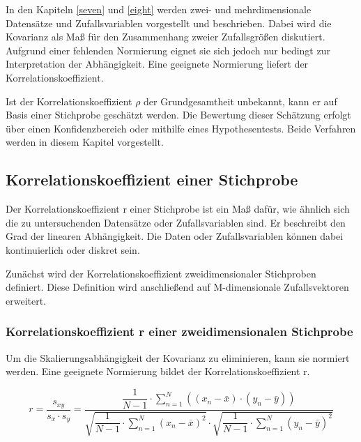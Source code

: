 \noindent In den Kapiteln \ref{seven} und \ref{eight} werden zwei- und mehrdimensionale Datens\"{a}tze und Zufallsvariablen vorgestellt und beschrieben. Dabei wird die Kovarianz als Ma{\ss} f\"{u}r den Zusammenhang zweier Zufallsgr\"{o}{\ss}en diskutiert. Aufgrund einer fehlenden Normierung eignet sie sich jedoch nur bedingt zur Interpretation der Abh\"{a}ngigkeit. Eine geeignete Normierung liefert der Korrelationskoeffizient.\newline

\noindent Ist der Korrelationskoeffizient $\rho$ der Grundgesamtheit unbekannt, kann er auf Basis einer Stichprobe gesch\"{a}tzt werden. Die Bewertung dieser Sch\"{a}tzung erfolgt \"{u}ber einen Konfidenzbereich oder mithilfe eines Hypothesentests. Beide Verfahren werden in diesem Kapitel vorgestellt.

\subsection{Korrelationskoeffizient einer Stichprobe}

\noindent Der Korrelationskoeffizient r einer Stichprobe ist ein Ma{\ss} daf\"{u}r, wie \"{a}hnlich sich die zu untersuchenden Datens\"{a}tze oder Zufallsvariablen sind. Er beschreibt den Grad der linearen Abh\"{a}ngigkeit. Die Daten oder Zufallsvariablen k\"{o}nnen dabei kontinuierlich oder diskret sein.\newline

\noindent Zun\"{a}chst wird der Korrelationskoeffizient zweidimensionaler Stichproben definiert. Diese Definition wird anschlie{\ss}end auf M-dimensionale Zufallsvektoren erweitert.


\subsubsection{Korrelationskoeffizient r einer zweidimensionalen Stichprobe}

\noindent Um die Skalierungsabh\"{a}ngigkeit der Kovarianz zu eliminieren, kann sie normiert werden. Eine geeignete Normierung bildet der Korrelationskoeffizient r.

\begin{equation}\label{eq:tenone}
r=\dfrac{s_{xy}}{s_{x} \cdot s_{y}} =\dfrac{\dfrac{1}{N-1} \cdot \sum _{n=1}^{N}\left((x_{n} -\bar{x})\cdot (y_{n} -\bar{y})\right) }{\sqrt{\dfrac{1}{N-1} \cdot \sum _{n=1}^{N}(x_{n} -\bar{x})^{2}} \cdot \sqrt{\dfrac{1}{N-1} \cdot \sum _{n=1}^{N}(y_{n} -\bar{y})^{2}}}
\end{equation}

